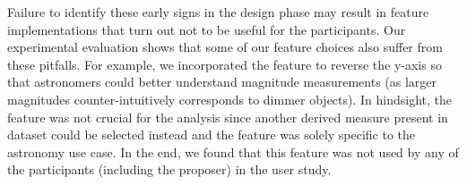 {\begin{itemize}
\end{itemize}
\par Failure to identify these early signs in the design phase may result in feature implementations that turn out not to be useful for the participants. 
Our experimental evaluation shows that some of our feature choices also suffer from these pitfalls. For example, we incorporated the feature to reverse the y-axis so that astronomers could better understand magnitude measurements (as larger magnitudes counter-intuitively corresponds to dimmer objects). In hindsight, the feature was not crucial for the analysis since another derived measure present in dataset could be selected instead and the feature was solely specific to the astronomy use case. In the end, we found that this feature was not used by any of the participants (including the proposer) in the user study.%
}
